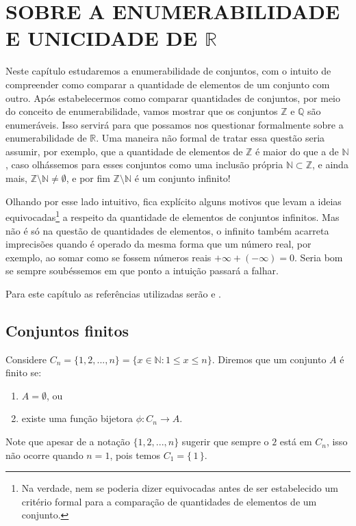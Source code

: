 \documentclass[../main.tex]{subfiles}
\makeatletter
\newcounter{saveenumerate}
\newcommand{\enumeratext}[1]{%
\setcounter{saveenumerate}{\value{enum\romannumeral\the\@enumdepth}}
\end{enumerate}
#1
\begin{enumerate}
\setcounter{enum\romannumeral\the\@enumdepth}{\value{saveenumerate}}%
}
\makeatother
\begin{document}
\chapter{SOBRE A ENUMERABILIDADE E UNICIDADE DE $\mathbb{R}$ }\label{cap-enumerabilidade}

Neste capítulo estudaremos a enumerabilidade de conjuntos, com o intuito de compreender como comparar a quantidade de elementos de um conjunto com outro. Após estabelecermos como comparar quantidades de conjuntos, por meio do conceito de enumerabilidade, vamos mostrar que os conjuntos $\mathbb{Z} $ e $ \mathbb{Q}$ são enumeráveis. Isso servirá para que possamos nos questionar formalmente sobre a enumerabilidade de $\mathbb{R}$. Uma maneira não formal de tratar essa questão seria assumir, por exemplo, que a quantidade de elementos de $\mathbb{Z}$ é maior do que a de $\mathbb{N}$, caso olhássemos para esses conjuntos como uma inclusão própria $\mathbb{N} \subset \mathbb{Z}$, e ainda mais, $\mathbb{Z} \setminus \mathbb{N} \neq \emptyset$, e por fim $\mathbb{Z} \setminus \mathbb{N}$ é um conjunto infinito! 

Olhando por esse lado intuitivo, fica explícito alguns motivos que levam a ideias equivocadas\footnote{Na verdade, nem se poderia dizer equivocadas antes de ser estabelecido um critério formal para a comparação de quantidades de elementos de um conjunto.} a respeito da quantidade de elementos de conjuntos infinitos. Mas não é só na questão de quantidades de elementos, o infinito também acarreta imprecisões quando é operado da mesma forma que um número real, por exemplo, ao somar como se fossem números reais $+\infty + (-\infty) = 0 $. Seria bom se sempre soubéssemos em que ponto a intuição passará a falhar.

Para este capítulo as referências utilizadas serão \textcite{lima-analise-1} e \textcite{bartle}.


\section{Conjuntos finitos}
\begin{defi}\label{enum-def-conjuntoFinito}
    Considere $C_n = \{ 1, 2, ..., n \} = \{ x \in \mathbb{N} : 1 \leq x \leq n \}$. Diremos que um conjunto $A$ é finito se:
    \begin{enumerate}[label=(\roman*)]
        \item $A = \emptyset$, ou
        \item existe uma função bijetora $\phi \colon C_n \to A$.
    \end{enumerate}
\end{defi}
\begin{obs}
    Note que apesar de a notação $\{ 1,2,...,n \}$ sugerir que sempre o $2$ está em $C_n$, isso não ocorre quando $n=1$, pois temos $C_1 = \{\,1\,\}$.
\end{obs}
\end{document}
